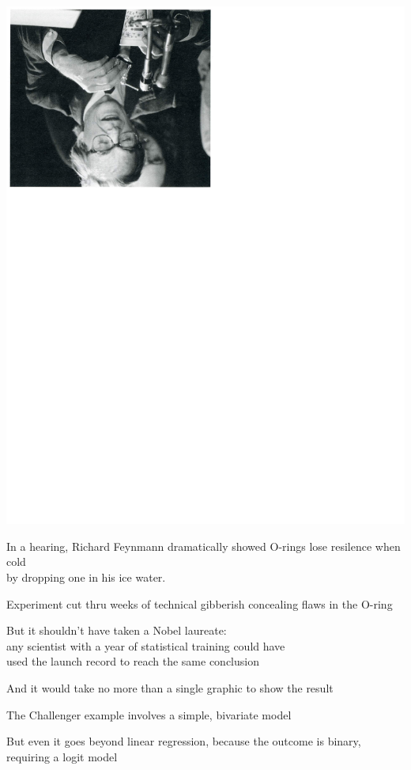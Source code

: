 \documentclass[pdflatex,landscape,titlepage]{foils}
\begin{document}
\vspace{-2 em}

\color{black}
\begin{center}
\includegraphics[width=4.5 in,angle=180]{feynnman}
\end{center}
\color{white}

In a hearing, Richard Feynmann dramatically showed O-rings lose resilence when cold\\
by dropping one in his ice water.

Experiment cut thru weeks of technical gibberish concealing flaws in the O-ring

But it shouldn't have taken a Nobel laureate: \\ 
any scientist with a year of statistical training could have \\
used the launch record to reach the same conclusion

And it would take no more than a single graphic to show the result


\bgclear

The Challenger example involves a simple, bivariate model

But even it goes beyond linear regression, because the outcome is binary, requiring a logit model
\end{document}
